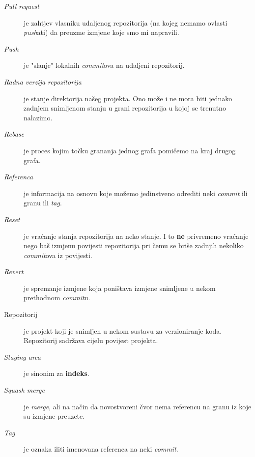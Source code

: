 \begin{description}
    \item[\emph{Pull request}] je zahtjev vlasniku udaljenog repozitorija (na kojeg nemamo ovlasti \emph{push}ati) da preuzme izmjene koje smo mi napravili.
    \item[\emph{Push}] je "slanje" lokalnih \emph{commit}ova na udaljeni repozitorij.
    \item[\emph{Radna verzija repozitorija}] je stanje direktorija našeg projekta. Ono može i ne mora biti jednako zadnjem snimljenom stanju u grani repozitorija u kojoj se trenutno nalazimo.
    \item[\emph{Rebase}] je proces kojim točku grananja jednog grafa pomičemo na kraj drugog grafa.
    \item[\emph{Referenca}] je informacija na osnovu koje možemo jedinstveno odrediti neki \emph{commit} ili granu ili \emph{tag}.
    \item[\emph{Reset}] je vraćanje stanja repozitorija na neko stanje. I to \textbf{ne} privremeno vraćanje nego baš izmjenu povijesti repozitorija pri čemu se briše zadnjih nekoliko \emph{commit}ova iz povijesti.
    \item[\emph{Revert}] je spremanje izmjene koja poništava izmjene snimljene u nekom prethodnom \emph{commit}u.
    \item[Repozitorij] je projekt koji je snimljen u nekom sustavu za verzioniranje koda. Repozitorij sadržava cijelu povijest projekta.
    \item[\emph{Staging area}] je sinonim za \textbf{indeks}.
    \item[\emph{Squash merge}] je \emph{merge}, ali na način da novostvoreni čvor nema referencu na granu iz koje su izmjene preuzete.
    \item[\emph{Tag}] je oznaka iliti imenovana referenca na neki \emph{commit}.
\end{description}


